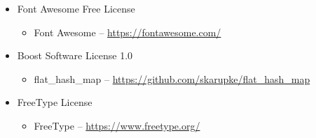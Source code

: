 \documentclass[hidelinks,titlepage,a4paper]{article}
\begin{document}
\begin{itemize}
\item Font Awesome Free License
\begin{itemize}
\item Font Awesome -- \url{https://fontawesome.com/}
\end{itemize}

\item Boost Software License 1.0
\begin{itemize}
\item flat\_hash\_map -- \url{https://github.com/skarupke/flat\_hash\_map}
\end{itemize}

\item FreeType License
\begin{itemize}
\item FreeType -- \url{https://www.freetype.org/}
\end{itemize}

\end{itemize}
\end{document}
